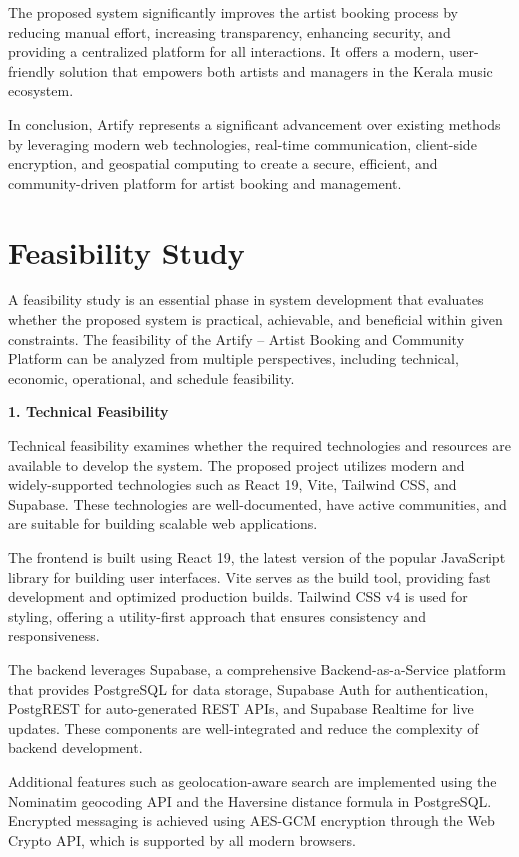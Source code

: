 \documentclass[12pt,a4paper]{report}
\begin{document}
The proposed system significantly improves the artist booking process by reducing manual effort, increasing transparency, enhancing security, and providing a centralized platform for all interactions. It offers a modern, user-friendly solution that empowers both artists and managers in the Kerala music ecosystem.

In conclusion, Artify represents a significant advancement over existing methods by leveraging modern web technologies, real-time communication, client-side encryption, and geospatial computing to create a secure, efficient, and community-driven platform for artist booking and management.

\section{Feasibility Study}
A feasibility study is an essential phase in system development that evaluates whether the proposed system is practical, achievable, and beneficial within given constraints. The feasibility of the Artify -- Artist Booking and Community Platform can be analyzed from multiple perspectives, including technical, economic, operational, and schedule feasibility.

\textbf{1. Technical Feasibility}

Technical feasibility examines whether the required technologies and resources are available to develop the system. The proposed project utilizes modern and widely-supported technologies such as React 19, Vite, Tailwind CSS, and Supabase. These technologies are well-documented, have active communities, and are suitable for building scalable web applications.

The frontend is built using React 19, the latest version of the popular JavaScript library for building user interfaces. Vite serves as the build tool, providing fast development and optimized production builds. Tailwind CSS v4 is used for styling, offering a utility-first approach that ensures consistency and responsiveness.

The backend leverages Supabase, a comprehensive Backend-as-a-Service platform that provides PostgreSQL for data storage, Supabase Auth for authentication, PostgREST for auto-generated REST APIs, and Supabase Realtime for live updates. These components are well-integrated and reduce the complexity of backend development.

Additional features such as geolocation-aware search are implemented using the Nominatim geocoding API and the Haversine distance formula in PostgreSQL. Encrypted messaging is achieved using AES-GCM encryption through the Web Crypto API, which is supported by all modern browsers.
\end{document}
